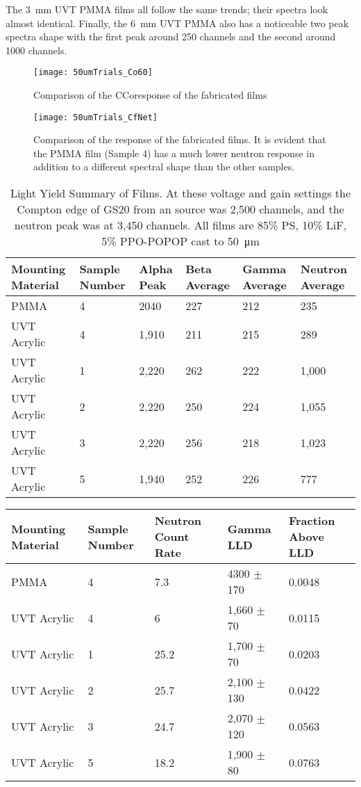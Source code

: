 \documentclass[draftcls,onecolumn]{IEEEtran}
\begin{document}
The \SI{3}{\mm} UVT PMMA films all follow the same trends; their spectra look almost identical.
Finally, the \SI{6}{\mm} UVT PMMA also has a noticeable two peak spectra shape with the first peak around 250 channels and the second around 1000 channels.
\begin{figure}[ht]
  \centering
  \texttt{[image: 50umTrials\_Co60]}
  \caption[Fabricated Film Comparison (Gamma)]{Comparison of the \iso[60]C{Co}response of the fabricated films}
  \label{fig:CompCo60}
\end{figure}
\begin{figure}[ht]
  \centering
  \texttt{[image: 50umTrials\_CfNet]}
  \caption[Fabricated Film Comparison (Neutron)]{Comparison of the  response of the fabricated films. It is evident that the PMMA film (Sample 4) has a much lower neutron response in addition to a different spectral shape than the other samples.}
  \label{fig:CompCf252}
\end{figure}
\begin{table}
\centering
\caption[Summary of Film Light Yield]{Light Yield Summary of Films. At these voltage and gain settings the Compton edge of GS20 from an  source was 2,500 channels, and the neutron peak was at 3,450 channels. All films are 85\% PS, 10\% LiF, 5\% PPO-POPOP cast to \SI{50}{\um}}
  \begin{tabular}{m{2cm} m{2cm} m{2cm} m{2cm} m{2cm} m{2cm}}
  \toprule
  Mounting Material	&	Sample Number	&	Alpha Peak	&	Beta Average	&	Gamma Average	&	Neutron Average	\\
  \midrule
  PMMA	&	4	&	2040	&	227	&	212	&	235	\\
  UVT Acrylic	&	4	&	1,910	&	211	&	215	&	289	\\
  UVT Acrylic	&	1	&	2,220	&	262	&	222	&	1,000	\\
  UVT Acrylic	&	2	&	2,220	&	250	&	224	&	1,055	\\
  UVT Acrylic	&	3	&	2,220	&	256	&	218	&	1,023	\\
  UVT Acrylic	&	5	&	1,940	&	252	&	226	&	777	\\
  \bottomrule
  \end{tabular}
\end{table}
\begin{table}
  \centering
  \begin{tabular}{m{2cm} m{2cm} m{2cm} m{2cm} m{2cm}}
  \toprule
  Mounting Material	&	Sample Number	&	Neutron Count Rate	&	Gamma LLD			&	Fraction Above LLD	\\
  \midrule
  PMMA	&	4	&	7.3	&	4300	$\pm$	170	&	0.0048	\\
  UVT Acrylic	&	4	&	6	&	1,660	$\pm$	70	&	0.0115	\\
  UVT Acrylic	&	1	&	25.2	&	1,700	$\pm$	70	&	0.0203	\\
  UVT Acrylic	&	2	&	25.7	&	2,100	$\pm$	130	&	0.0422	\\
  UVT Acrylic	&	3	&	24.7	&	2,070	$\pm$	120	&	0.0563	\\
  UVT Acrylic	&	5	&	18.2	&	1,900	$\pm$	80	&	0.0763	\\
  \bottomrule
  \end{tabular}
\end{table}
\end{document}
